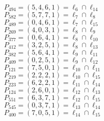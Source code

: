 \documentclass{article}
\begin{document}
{\begin{multicols}{2}
$P_{494} = ( 5, 4, 6, 1 ) = \ell_{6} \cap \ell_{14} $\\
$P_{582} = ( 5, 7, 7, 1 ) = \ell_{7} \cap \ell_{8} $\\
$P_{489} = ( 0, 4, 6, 1 ) = \ell_{7} \cap \ell_{15} $\\
$P_{269} = ( 4, 0, 3, 1 ) = \ell_{8} \cap \ell_{9} $\\
$P_{377} = ( 0, 6, 4, 1 ) = \ell_{8} \cap \ell_{10} $\\
$P_{412} = ( 3, 2, 5, 1 ) = \ell_{8} \cap \ell_{13} $\\
$P_{382} = ( 5, 6, 4, 1 ) = \ell_{9} \cap \ell_{11} $\\
$P_{409} = ( 0, 2, 5, 1 ) = \ell_{9} \cap \ell_{12} $\\
$P_{121} = ( 7, 5, 0, 1 ) = \ell_{10} \cap \ell_{11} $\\
$P_{219} = ( 2, 2, 2, 1 ) = \ell_{10} \cap \ell_{15} $\\
$P_{223} = ( 6, 2, 2, 1 ) = \ell_{11} \cap \ell_{14} $\\
$P_{124} = ( 2, 6, 0, 1 ) = \ell_{12} \cap \ell_{13} $\\
$P_{551} = ( 6, 3, 7, 1 ) = \ell_{12} \cap \ell_{15} $\\
$P_{545} = ( 0, 3, 7, 1 ) = \ell_{13} \cap \ell_{14} $\\
$P_{400} = ( 7, 0, 5, 1 ) = \ell_{14} \cap \ell_{15} $\\
\end{multicols}
}
\end{document}
